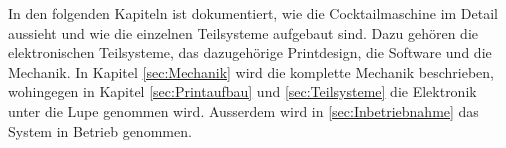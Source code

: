 In den folgenden Kapiteln ist dokumentiert, wie die Cocktailmaschine im Detail aussieht und wie die einzelnen Teilsysteme aufgebaut sind. Dazu gehören die elektronischen Teilsysteme, das dazugehörige Printdesign, die Software und die Mechanik. In Kapitel \ref{sec:Mechanik} wird die komplette Mechanik beschrieben, wohingegen in Kapitel \ref{sec:Printaufbau} und \ref{sec:Teilsysteme} die Elektronik unter die Lupe genommen wird. Ausserdem wird in \ref{sec:Inbetriebnahme} das  System in Betrieb genommen.  